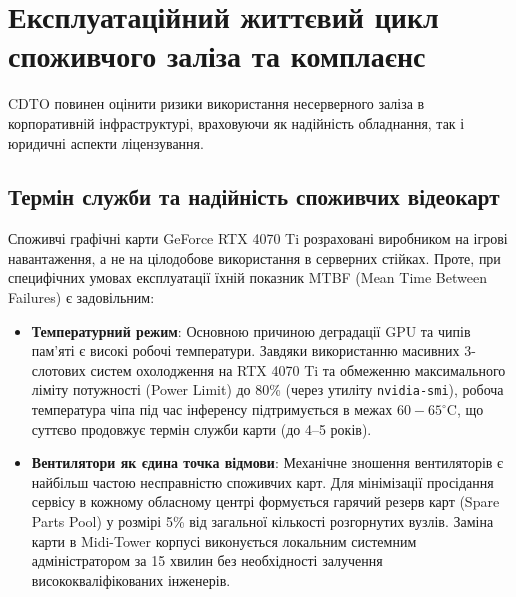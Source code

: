 \documentclass{article}
\begin{document}
\section{Експлуатаційний життєвий цикл споживчого заліза та комплаєнс}
CDTO повинен оцінити ризики використання несерверного заліза в корпоративній інфраструктурі, враховуючи як надійність обладнання, так і юридичні аспекти ліцензування.

\subsection{Термін служби та надійність споживчих відеокарт}
Споживчі графічні карти GeForce RTX 4070 Ti розраховані виробником на ігрові навантаження, а не на цілодобове використання в серверних стійках. Проте, при специфічних умовах експлуатації їхній показник MTBF (Mean Time Between Failures) є задовільним:
\begin{itemize}
\item \textbf{Температурний режим}: Основною причиною деградації GPU та чипів пам'яті є високі робочі температури. Завдяки використанню масивних 3-слотових систем охолодження на RTX 4070 Ti та обмеженню максимального ліміту потужності (Power Limit) до 80\% (через утиліту \texttt{nvidia-smi}), робоча температура чіпа під час інференсу підтримується в межах $60-65^\circ\text{C}$, що суттєво продовжує термін служби карти (до 4--5 років).
\item \textbf{Вентилятори як єдина точка відмови}: Механічне зношення вентиляторів є найбільш частою несправністю споживчих карт. Для мінімізації просідання сервісу в кожному обласному центрі формується гарячий резерв карт (Spare Parts Pool) у розмірі 5\% від загальної кількості розгорнутих вузлів. Заміна карти в Midi-Tower корпусі виконується локальним системним адміністратором за 15 хвилин без необхідності залучення висококваліфікованих інженерів.
\end{itemize}
\end{document}
